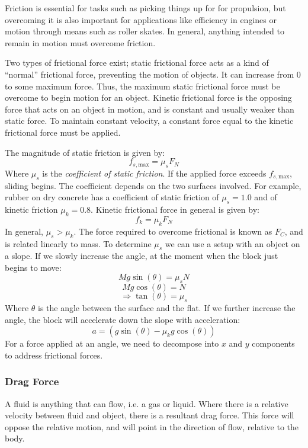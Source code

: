 \documentclass[12pt]{report}
\begin{document}
\begin{flushleft}
\bigskip
Friction is essential for tasks such as picking things up for for propulsion, but overcoming
it is also important for applications like efficiency in engines or motion through means such as 
roller skates. In general, anything intended to remain in motion must overcome friction.

\bigskip
Two types of frictional force exist; static frictional force acts as a kind of ``normal'' frictional
force, preventing the motion of objects. It can increase from 0 to some maximum force. Thus, the maximum
static frictional force must be overcome to begin motion for an object. Kinetic frictional force is the 
opposing force that acts on an object in motion, and is constant and usually weaker than static force. To
maintain constant velocity, a constant force equal to the kinetic frictional force must be applied.

\bigskip
The magnitude of static friction is given by:
\[f_{s, \mathrm{max}} = \mu_sF_N\]
Where \(\mu_s\) is the \textit{coefficient of static friction}. If the applied force
exceeds \(f_{s, \mathrm{max}}\), sliding begins. The coefficient depends on the two surfaces
involved. For example, rubber on dry concrete has a coefficient of static friction of \(\mu_s = 1.0\) and
of kinetic friction \(\mu_k = 0.8\). Kinetic frictional force in general is given by:
\[f_k = \mu_kF_N\]
In general, \(\mu_s > \mu_k\). The force required to overcome frictional is known as \(F_C\), and is 
related linearly to mass. To determine \(\mu_s\) we can use a setup with an object on a slope. If we slowly
increase the angle, at the moment when the block just begins to move:
\[Mg\sin(\theta) = \mu_sN\]
\[Mg\cos(\theta) = N\]
\[\Rightarrow \tan(\theta) = \mu_s\]
Where \(\theta\) is the angle between the surface and the flat. If we further increase the angle, the block
will accelerate down the slope with acceleration:
\[a = (g\sin(\theta) - \mu_kg\cos(\theta))\]
For a force applied at an angle, we need to decompose into \(x\) and \(y\) components to 
address frictional forces.

\subsubsection*{Drag Force}
A fluid is anything that can flow, i.e. a gas or liquid. Where there is a relative velocity between fluid
and object, there is a resultant drag force. This force will oppose the relative motion, and will point
in the direction of flow, relative to the body.


\end{flushleft}
\end{document}
